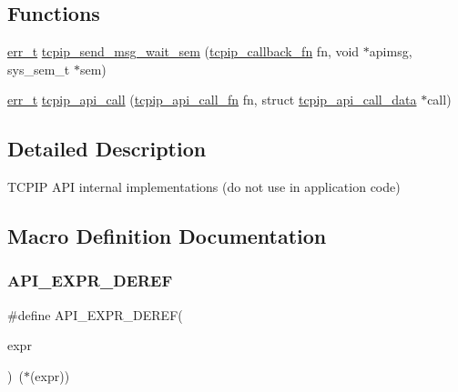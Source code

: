 \subsection*{Functions}
\begin{DoxyCompactItemize}
\item 
\hyperlink{group__infrastructure__errors_gaf02d9da80fd66b4f986d2c53d7231ddb}{err\+\_\+t} \hyperlink{openmote-cc2538_2lwip_2src_2include_2lwip_2priv_2tcpip__priv_8h_a12bdf37eddcd72c4178e3ea7d370395d}{tcpip\+\_\+send\+\_\+msg\+\_\+wait\+\_\+sem} (\hyperlink{openmote-cc2538_2lwip_2src_2include_2lwip_2tcpip_8h_a35203296bb838f3b493839ffc6e7285d}{tcpip\+\_\+callback\+\_\+fn} fn, void $\ast$apimsg, sys\+\_\+sem\+\_\+t $\ast$sem)
\item 
\hyperlink{group__infrastructure__errors_gaf02d9da80fd66b4f986d2c53d7231ddb}{err\+\_\+t} \hyperlink{openmote-cc2538_2lwip_2src_2include_2lwip_2priv_2tcpip__priv_8h_a3d42b0c46607f91aedcc7745ed466b08}{tcpip\+\_\+api\+\_\+call} (\hyperlink{openmote-cc2538_2lwip_2src_2include_2lwip_2priv_2tcpip__priv_8h_aa7ecde8c8d8012fe5c498f7ee58f9458}{tcpip\+\_\+api\+\_\+call\+\_\+fn} fn, struct \hyperlink{structtcpip__api__call__data}{tcpip\+\_\+api\+\_\+call\+\_\+data} $\ast$call)
\end{DoxyCompactItemize}


\subsection{Detailed Description}
T\+C\+P\+IP A\+PI internal implementations (do not use in application code) 

\subsection{Macro Definition Documentation}
\mbox{\label{openmote-cc2538_2lwip_2src_2include_2lwip_2priv_2tcpip__priv_8h_a4b2322aa0c1906f84f16acf359f06a92}} 
\subsubsection{\texorpdfstring{A\+P\+I\+\_\+\+E\+X\+P\+R\+\_\+\+D\+E\+R\+EF}{API\_EXPR\_DEREF}}
{\footnotesize\ttfamily \#define A\+P\+I\+\_\+\+E\+X\+P\+R\+\_\+\+D\+E\+R\+EF(\begin{DoxyParamCaption}\item[{}]{expr }\end{DoxyParamCaption})~($\ast$(expr))}

